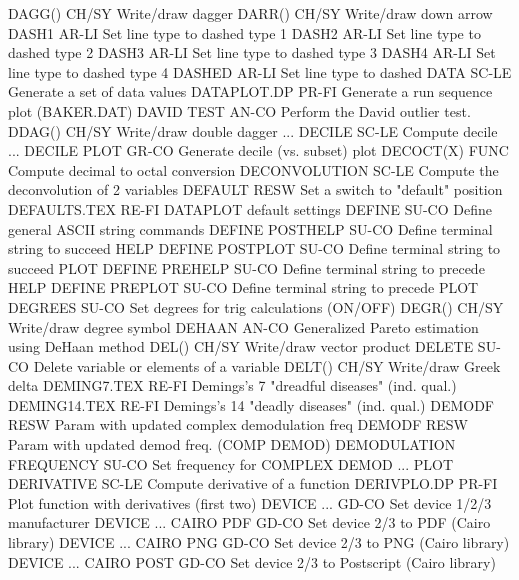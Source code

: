 DAGG()                      CH/SY Write/draw dagger
DARR()                      CH/SY Write/draw down arrow
DASH1                       AR-LI Set line type to dashed type 1
DASH2                       AR-LI Set line type to dashed type 2
DASH3                       AR-LI Set line type to dashed type 3
DASH4                       AR-LI Set line type to dashed type 4
DASHED                      AR-LI Set line type to dashed
DATA                        SC-LE Generate a set of data values
DATAPLOT.DP                 PR-FI Generate a run sequence plot (BAKER.DAT)
DAVID TEST                  AN-CO Perform the David outlier test.
DDAG()                      CH/SY Write/draw double dagger
... DECILE                  SC-LE Compute decile
... DECILE PLOT             GR-CO Generate decile (vs. subset) plot
DECOCT(X)                   FUNC  Compute decimal to octal conversion
DECONVOLUTION               SC-LE Compute the deconvolution of 2 variables
DEFAULT                     RESW  Set a switch to "default" position
DEFAULTS.TEX                RE-FI DATAPLOT default settings
DEFINE                      SU-CO Define general ASCII string commands
DEFINE POSTHELP             SU-CO Define terminal string to succeed HELP
DEFINE POSTPLOT             SU-CO Define terminal string to succeed PLOT
DEFINE PREHELP              SU-CO Define terminal string to precede HELP
DEFINE PREPLOT              SU-CO Define terminal string to precede PLOT
DEGREES                     SU-CO Set degrees for trig calculations (ON/OFF)
DEGR()                      CH/SY Write/draw degree symbol
DEHAAN                      AN-CO Generalized Pareto estimation using DeHaan method
DEL()                       CH/SY Write/draw vector product
DELETE                      SU-CO Delete variable or elements of a variable
DELT()                      CH/SY Write/draw Greek delta
DEMING7.TEX                 RE-FI Demings's 7 "dreadful diseases" (ind. qual.)
DEMING14.TEX                RE-FI Demings's 14 "deadly diseases" (ind. qual.)
DEMODF                      RESW  Param with updated complex demodulation freq
DEMODF                      RESW  Param with updated demod freq. (COMP DEMOD)
DEMODULATION FREQUENCY      SU-CO Set frequency for COMPLEX DEMOD ... PLOT
DERIVATIVE                  SC-LE Compute derivative of a function
DERIVPLO.DP                 PR-FI Plot function with derivatives (first two)
DEVICE ...                  GD-CO Set device 1/2/3 manufacturer
DEVICE ... CAIRO PDF        GD-CO Set device 2/3 to PDF (Cairo library)
DEVICE ... CAIRO PNG        GD-CO Set device 2/3 to PNG (Cairo library)
DEVICE ... CAIRO POST       GD-CO Set device 2/3 to Postscript (Cairo library)
